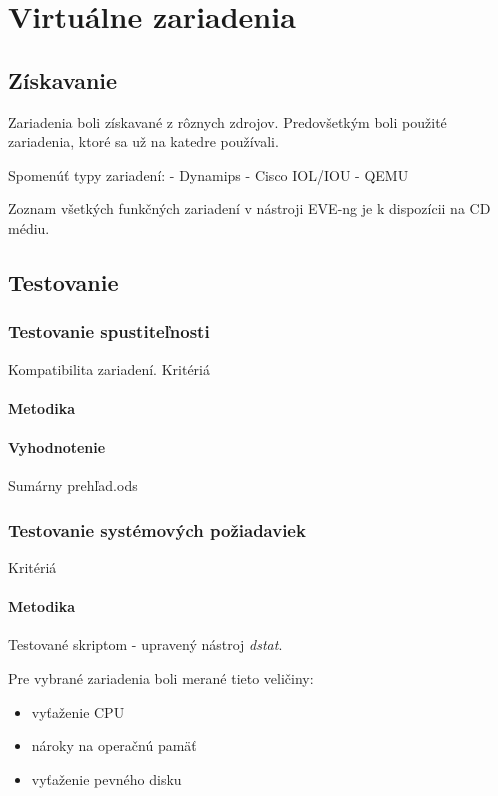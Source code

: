 \chapter{Virtuálne zariadenia}

\section{Získavanie}

Zariadenia boli získavané z rôznych zdrojov. Predovšetkým boli použité zariadenia, ktoré sa už na katedre používali.

Spomenúť typy zariadení:
  - Dynamips
  - Cisco IOL/IOU
  - QEMU
  
Zoznam všetkých funkčných zariadení v nástroji EVE-ng je k dispozícii na CD médiu.

\section{Testovanie}
\label{chap:testovanie_zariadeni}

\subsection{Testovanie spustiteľnosti}

Kompatibilita zariadení.
Kritériá

\subsubsection{Metodika}

\subsubsection{Vyhodnotenie}

Sumárny prehľad.ods

\subsection{Testovanie systémových požiadaviek}
\label{chap:testovanie_zariadeni_benchmark}

Kritériá

\subsubsection{Metodika}

Testované skriptom - upravený nástroj \emph{dstat}.


Pre vybrané zariadenia boli merané tieto veličiny:
\begin{itemize}
\item vyťaženie CPU
\item nároky na operačnú pamäť
\item vyťaženie pevného disku
\end{itemize}

